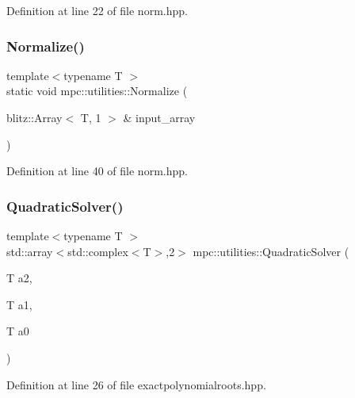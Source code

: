 Definition at line 22 of file norm.\+hpp.

\mbox{\label{namespacempc_1_1utilities_a2b888b4e5d7d4fe16a1c97c120d0494f}} 
\subsubsection{\texorpdfstring{Normalize()}{Normalize()}}
{\footnotesize\ttfamily template$<$typename T $>$ \\
static void mpc\+::utilities\+::\+Normalize (\begin{DoxyParamCaption}\item[{blitz\+::\+Array$<$ T, 1 $>$ \&}]{input\+\_\+array }\end{DoxyParamCaption})\hspace{0.3cm}{\ttfamily [static]}}



Definition at line 40 of file norm.\+hpp.

\mbox{\label{namespacempc_1_1utilities_ad175f8823052a6c863ffb2e90e2b08ca}} 
\subsubsection{\texorpdfstring{Quadratic\+Solver()}{QuadraticSolver()}}
{\footnotesize\ttfamily template$<$typename T $>$ \\
std\+::array$<$std\+::complex$<$T$>$,2$>$ mpc\+::utilities\+::\+Quadratic\+Solver (\begin{DoxyParamCaption}\item[{T}]{a2,  }\item[{T}]{a1,  }\item[{T}]{a0 }\end{DoxyParamCaption})}



Definition at line 26 of file exactpolynomialroots.\+hpp.

\mbox{\label{namespacempc_1_1utilities_a86772b476b0e0aa1567f42c8a9aa7a3c}} 
